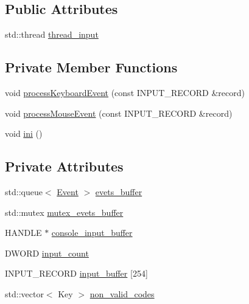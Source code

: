 \subsection*{Public Attributes}
\begin{DoxyCompactItemize}
\item 
std\+::thread \mbox{\hyperlink{classsc_1_1_console_module_event_a5a09e0aedb260fe975aa9854b278d277}{thread\+\_\+input}}
\end{DoxyCompactItemize}
\subsection*{Private Member Functions}
\begin{DoxyCompactItemize}
\item 
void \mbox{\hyperlink{classsc_1_1_console_module_event_a056aa2b523fd96ae69469782035350cb}{process\+Keyboard\+Event}} (const I\+N\+P\+U\+T\+\_\+\+R\+E\+C\+O\+RD \&record)
\item 
void \mbox{\hyperlink{classsc_1_1_console_module_event_a1500a488043b4ff64ec003a5a70ea7e3}{process\+Mouse\+Event}} (const I\+N\+P\+U\+T\+\_\+\+R\+E\+C\+O\+RD \&record)
\item 
void \mbox{\hyperlink{classsc_1_1_console_module_event_a09b228dceb2e5ad6b0c37827757c0588}{ini}} ()
\end{DoxyCompactItemize}
\subsection*{Private Attributes}
\begin{DoxyCompactItemize}
\item 
std\+::queue$<$ \mbox{\hyperlink{classsc_1_1_event}{Event}} $>$ \mbox{\hyperlink{classsc_1_1_console_module_event_a0e18979e00b6126df42aed3e5c7331ec}{evets\+\_\+buffer}}
\item 
std\+::mutex \mbox{\hyperlink{classsc_1_1_console_module_event_a0b13bccf291012ba88b883c2b07e5b60}{mutex\+\_\+evets\+\_\+buffer}}
\item 
H\+A\+N\+D\+LE $\ast$ \mbox{\hyperlink{classsc_1_1_console_module_event_a03489de10c6d5179534696097964de97}{console\+\_\+input\+\_\+buffer}}
\item 
D\+W\+O\+RD \mbox{\hyperlink{classsc_1_1_console_module_event_a3712d1634c010fa2abc70e89f6040114}{input\+\_\+count}}
\item 
I\+N\+P\+U\+T\+\_\+\+R\+E\+C\+O\+RD \mbox{\hyperlink{classsc_1_1_console_module_event_adac0f2d84c4028510e249be4f27c9b45}{input\+\_\+buffer}} \mbox{[}254\mbox{]}
\item 
std\+::vector$<$ Key $>$ \mbox{\hyperlink{classsc_1_1_console_module_event_a946c2799043de3e6ad0c6c0550bca8d1}{non\+\_\+valid\+\_\+codes}}
\end{DoxyCompactItemize}
